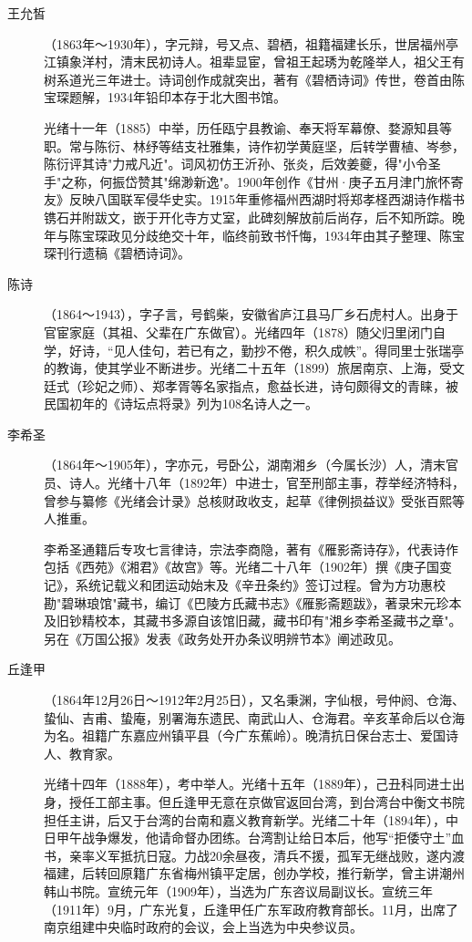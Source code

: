 \begin{description}
  \item[王允皙] （1863年～1930年），字元辩，号又点、碧栖，祖籍福建长乐，世居福州亭江镇象洋村，清末民初诗人。祖辈显宦，曾祖王起琇为乾隆举人，祖父王有树系道光三年进士。诗词创作成就突出，著有《碧栖诗词》传世，卷首由陈宝琛题解，1934年铅印本存于北大图书馆。\par
        光绪十一年（1885）中举，历任瓯宁县教谕、奉天将军幕僚、婺源知县等职。常与陈衍、林纾等结支社雅集，诗作初学黄庭坚，后转学曹植、岑参，陈衍评其诗"力戒凡近"。词风初仿王沂孙、张炎，后效姜夔，得"小令圣手"之称，何振岱赞其"绵渺新逸"。1900年创作《甘州·庚子五月津门旅怀寄友》反映八国联军侵华史实。1915年重修福州西湖时将郑孝柽西湖诗作楷书镌石并附跋文，嵌于开化寺方丈室，此碑刻解放前后尚存，后不知所踪。晚年与陈宝琛政见分歧绝交十年，临终前致书忏悔，1934年由其子整理、陈宝琛刊行遗稿《碧栖诗词》。
  \item[陈诗] （1864～1943），字子言，号鹤柴，安徽省庐江县马厂乡石虎村人。出身于官宦家庭（其祖、父辈在广东做官）。光绪四年（1878）随父归里闭门自学，好诗，“见人佳句，若已有之，勤抄不倦，积久成帙”。得同里士张瑞亭的教诲，使其学业不断进步。光绪二十五年（1899）旅居南京、上海，受文廷式（珍妃之师）、郑孝胥等名家指点，愈益长进，诗句颇得文的青睐，被民国初年的《诗坛点将录》列为108名诗人之一。
  \item[李希圣] （1864年～1905年），字亦元，号卧公，湖南湘乡（今属长沙）人，清末官员、诗人。光绪十八年（1892年）中进士，官至刑部主事，荐举经济特科，曾参与纂修《光绪会计录》总核财政收支，起草《律例损益议》受张百熙等人推重。\par
        李希圣通籍后专攻七言律诗，宗法李商隐，著有《雁影斋诗存》，代表诗作包括《西苑》《湘君》《故宫》等。光绪二十八年（1902年）撰《庚子国变记》，系统记载义和团运动始末及《辛丑条约》签订过程。曾为方功惠校勘"碧琳琅馆"藏书，编订《巴陵方氏藏书志》《雁影斋题跋》，著录宋元珍本及旧钞精校本，其藏书多源自该馆旧藏，藏书印有"湘乡李希圣藏书之章"。另在《万国公报》发表《政务处开办条议明辨节本》阐述政见。
  \item[丘逢甲] （1864年12月26日～1912年2月25日），又名秉渊，字仙根，号仲阏、仓海、蛰仙、吉甫、蛰庵，别署海东遗民、南武山人、仓海君。辛亥革命后以仓海为名。祖籍广东嘉应州镇平县（今广东蕉岭）。晚清抗日保台志士、爱国诗人、教育家。\par
        光绪十四年（1888年），考中举人。光绪十五年（1889年），己丑科同进士出身，授任工部主事。但丘逢甲无意在京做官返回台湾，到台湾台中衡文书院担任主讲，后又于台湾的台南和嘉义教育新学。光绪二十年（1894年），中日甲午战争爆发，他请命督办团练。台湾割让给日本后，他写“拒倭守土”血书，亲率义军抵抗日寇。力战20余昼夜，清兵不援，孤军无继战败，遂内渡福建，后转回原籍广东省梅州镇平定居，创办学校，推行新学，曾主讲潮州韩山书院。宣统元年（1909年），当选为广东咨议局副议长。宣统三年（1911年）9月，广东光复，丘逢甲任广东军政府教育部长。11月，出席了南京组建中央临时政府的会议，会上当选为中央参议员。\par

\end{description}
